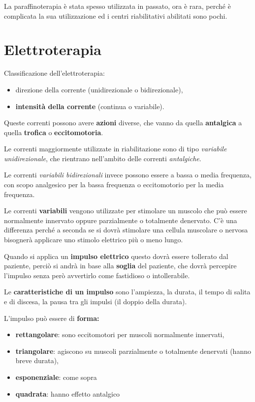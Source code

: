 La paraffinoterapia è stata spesso utilizzata in passato, ora è rara, perché è complicata la sua utilizzazione ed i centri riabilitativi abilitati sono pochi.

\section{Elettroterapia}

Classificazione dell'elettroterapia: 
\begin{itemize}
\item direzione della corrente (unidirezionale o bidirezionale),
\item \textbf{intensità della corrente} (continua o variabile).
\end{itemize}
Queste correnti possono avere \textbf{azioni} diverse, che vanno da quella \textbf{antalgica} a quella \textbf{trofica} o \textbf{eccitomotoria}.

Le correnti maggiormente utilizzate in riabilitazione sono di tipo \emph{variabile unidirezionale}, che rientrano nell'ambito delle correnti \emph{antalgiche}.

Le correnti \emph{variabili bidirezionali} invece possono essere a bassa o media frequenza, con scopo analgesico per la bassa frequenza o eccitomotorio per la media frequenza.

Le correnti \textbf{variabili} vengono utilizzate per stimolare un muscolo che può essere normalmente innervato oppure parzialmente o totalmente denervato. C'è una differenza perché a seconda se si dovrà stimolare una cellula muscolare o nervosa bisognerà applicare uno stimolo elettrico più o meno lungo.

Quando si applica un \textbf{impulso elettrico} questo dovrà essere tollerato dal paziente, perciò si andrà in base alla \textbf{soglia} del paziente, che dovrà percepire l'impulso senza però avvertirlo come fastidioso o intollerabile.

Le \textbf{caratteristiche di un impulso} sono l'ampiezza, la durata, il tempo di salita e di discesa, la pausa tra gli impulsi (il doppio della durata).

L'impulso può essere di \textbf{forma:}
\begin{itemize}
\item  \textbf{rettangolare}: sono eccitomotori per muscoli normalmente innervati,
\item
  \textbf{triangolare}: agiscono su muscoli parzialmente o totalmente denervati (hanno breve durata),
\item
  \textbf{esponenziale}: come sopra
\item
  \textbf{quadrata}: hanno effetto antalgico
\end{itemize}

